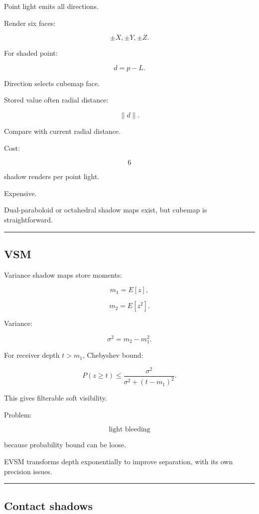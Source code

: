 Point light emits all directions.

Render six faces:

\[
\pm X,\pm Y,\pm Z.
\]

For shaded point:

\[
d=p-L.
\]

Direction selects cubemap face.

Stored value often radial distance:

\[
\|d\|.
\]

Compare with current radial distance.

Cost:

\[
6
\]

shadow renders per point light.

Expensive.

Dual-paraboloid or octahedral shadow maps exist, but cubemap is straightforward.

\begin{center}\rule{0.5\linewidth}{0.5pt}\end{center}

\subsection{VSM}\label{04-visual-computing-ii-ch040-vsm}

Variance shadow maps store moments:

\[
m_1=E[z],
\]

\[
m_2=E[z^2].
\]

Variance:

\[
\sigma^2=
m_2-m_1^2.
\]

For receiver depth \(t>m_1\), Chebyshev bound:

\[
\boxed{
P(z\ge t)
\le
\frac{
\sigma^2
}{
\sigma^2+(t-m_1)^2
}.
}
\]

This gives filterable soft visibility.

Problem:

\[
\boxed{\text{light bleeding}}
\]

because probability bound can be loose.

EVSM transforms depth exponentially to improve separation, with its own precision issues.

\begin{center}\rule{0.5\linewidth}{0.5pt}\end{center}

\subsection{Contact shadows}\label{04-visual-computing-ii-ch040-contact-shadows}

